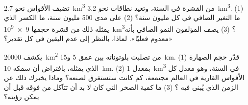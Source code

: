 \begin{exercise}[$\star\star\star$]\label{exo:g12:subduction-magmatism:14}
تضيف الأقواس نحو \qty{2.7}{km^3} من القشرة في السنة، وتعيد نطاقات 
نحو \qty{3.2}{km^3}. (1) ما التغير الصافي في كل مليون سنة؟
(2) على مدى 500 مليون سنة، ما الكسر الذي يمثله ذلك من قشرة حجمها \qty{9e9}{km^3}؟
(3) يصف المؤلفون النمو الصافي بأنه «معدوم فعليًا». لماذا، بالنظر إلى
عدم اليقين في كل تقدير؟
\end{exercise}

\begin{exercise}[$\star\star\star$]\label{exo:g12:subduction-magmatism:15}
يكشف  \qty{20000}{km^2} من  تصلبت بلوتوناته
بين عمق 5 و\qty{15}{km}. (1) قدّر حجم الصهارة
الذي يمثله، بافتراض أن سمكه \qty{10}{km}. (2) بمعدل \qty{1}{km^3} في السنة،
وهو معدل كل الأقواس القارية في العالم مجتمعة، كم كانت ستستغرق
لصنعه؟ وماذا يخبرك ذلك عن الزمن الذي يُبنى فيه
؟
(3) ما كمية الصخر التي كان لا بد أن تتآكل من فوقه قبل أن يمكن رؤيته؟
\end{exercise}

